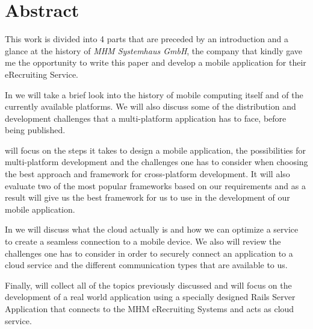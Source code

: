\begingroup
\let\clearpage\relax
\let\cleardoublepage\relax
\let\cleardoublepage\relax
\vfill
\chapter*{Abstract}
This work is divided into 4 parts that are preceded by an introduction and a glance at the history of \emph{MHM Systemhaus GmbH}, the company that kindly gave me the opportunity to write this paper and develop a mobile application for their eRecruiting Service.

In  we will take a brief look into the history of mobile computing itself and of the currently available platforms. We will also discuss some of the distribution and development challenges that a multi-platform application has to face, before being published. 

 will focus on the steps it takes to design a mobile application, the possibilities for multi-platform development and the challenges one has to consider when choosing the best approach and framework for cross-platform development. It will also evaluate two of the most popular frameworks based on our requirements and as a result will give us the best framework for us to use in the development of our mobile application.

In  we will discuss what the cloud actually is and how we can optimize a service to create a seamless connection to a mobile device. We also will review the challenges one has to consider in order to securely connect an application to a cloud service and the different communication types that are available to us.

Finally,  will collect all of the topics previously discussed and will focus on the development of a real world application using a specially designed Rails Server Application that connects to the MHM eRecruiting Systems and acts as cloud service.       


\vfill


\endgroup			

\vfill